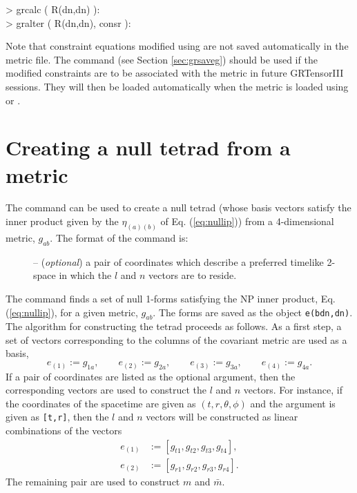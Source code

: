 \documentclass{article}
\begin{document}
\begin{ttfamily}
  \noindent > grcalc ( R(dn,dn) ):\\
  > gralter ( R(dn,dn), consr ):\\
\end{ttfamily}

Note that constraint equations modified using  are
not saved automatically in the metric file. The command 
(see Section \ref{sec:grsaveg})
should be used if the modified constraints are to be associated with the
metric in future GRTensorIII sessions. They will then be loaded automatically
when the metric is loaded using  or .
%
\section{Creating a null tetrad from a metric}\label{sec:nptetrad}
%
The command  can be used to create a null tetrad
(whose basis vectors satisfy the inner product given by the
$\eta_{(a)(b)}$ of Eq. (\ref{eq:nullip})) from a 4-dimensional
metric, $g_{ab}$.  The format of the command is:\\
%
\begin{cmdspec}
  \label{spec:nptetrad}

  \begin{description}
    \item[] -- (\textit{optional}) a pair of coordinates
      which describe a preferred timelike 2-space in which the $l$ and $n$
      vectors are to reside.
  \end{description}

\end{cmdspec}

The command finds a set of null 1-forms satisfying the NP inner
product, Eq. (\ref{eq:nullip}), for a given metric, $g_{ab}$.
The forms are saved as the object \texttt{e(bdn,dn)}.\\

The algorithm for constructing the tetrad proceeds as follows. As a first
step, a set of vectors corresponding to the columns of the covariant
metric are used as a basis,
\[
  e_{(1)} := g_{1a}, \qquad e_{(2)} := g_{2a}, \qquad  e_{(3)} := g_{3a},
  \qquad e_{(4)} := g_{4a}.
\]
If a pair of coordinates are listed as the optional 
argument, then the corresponding vectors are used to construct the $l$
and $n$ vectors. For instance, if the coordinates of the spacetime are
given as $(t,r,\theta,\phi)$ and the argument is given as
\texttt{[t,r]}, then the $l$ and $n$ vectors will be constructed as
linear combinations of the vectors
\begin{align*}
  e_{(1)} & := [g_{t1}, g_{t2}, g_{t3}, g_{t4} ], \\
  e_{(2)} & := [g_{r1}, g_{r2}, g_{r3}, g_{r4} ].
\end{align*}
The remaining pair are used to construct $m$ and $\bar{m}$. 
\end{document}
